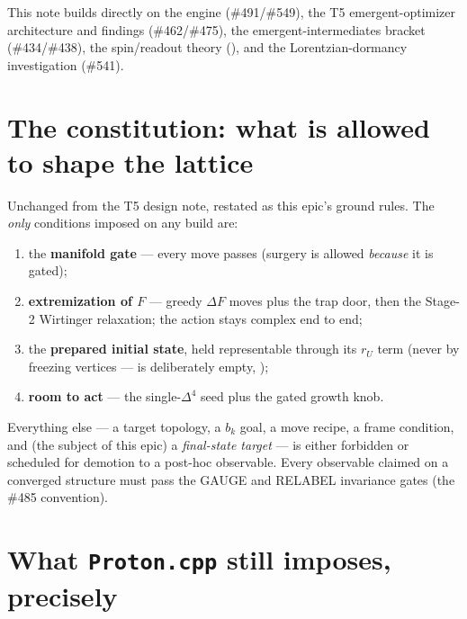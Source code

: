 \documentclass[11pt]{article}
\newcommand{\rU}{r_{U}}
\begin{document}
This note builds directly on the  engine (\#491/\#549), the T5
emergent-optimizer architecture and findings (\#462/\#475), the emergent-intermediates
bracket (\#434/\#438), the spin/readout theory
(), and the Lorentzian-dormancy investigation
(\#541).

\section{The constitution: what is allowed to shape the lattice}
\label{sec:constitution}

Unchanged from the T5 design note, restated as this epic's ground rules. The \emph{only}
conditions imposed on any build are:
\begin{enumerate}[leftmargin=2em]
  \item the \textbf{manifold gate} --- every move passes 
        (surgery is allowed \emph{because} it is gated);
  \item \textbf{extremization of $F$} --- greedy $\Delta F$ moves plus the trap door,
        then the Stage-2 Wirtinger relaxation; the action stays complex end to end;
  \item the \textbf{prepared initial state}, held representable through its $\rU$ term
        (never by freezing vertices ---  is
        deliberately empty, );
  \item \textbf{room to act} --- the single-$\Delta^4$ seed plus the gated 
        growth knob.
\end{enumerate}
Everything else --- a target topology, a $b_k$ goal, a move recipe, a frame condition,
and (the subject of this epic) a \emph{final-state target} --- is either forbidden or
scheduled for demotion to a post-hoc observable. Every observable claimed on a converged
structure must pass the GAUGE and RELABEL invariance gates (the \#485 convention).

\section[What Proton.cpp still imposes, precisely]{What \texttt{Proton.cpp} still imposes, precisely}
\label{sec:imposed}
\end{document}
